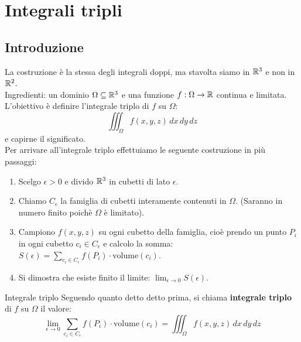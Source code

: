 \chapter{Integrali tripli}

\section{Introduzione}
La costruzione è la stessa degli integrali doppi, ma stavolta siamo in $\mathbb{R}^3$ e non in $\mathbb{R}^2$.\\
Ingredienti: un dominio $\Omega \subseteq \mathbb{R}^3$ e una funzione $f:\Omega \rightarrow \mathbb{R}$ continua e limitata.\\
L'obiettivo è definire l'integrale triplo di $f$ su $\Omega$:
\[
\iiint_{\Omega} f(x,y,z) \, dx \, dy \, dz
\]
e capirne il significato.\\
Per arrivare all'integrale triplo effettuiamo le seguente costruzione in più passaggi:
\begin{enumerate}
  \item Scelgo $\epsilon>0$ e divido $\mathbb{R}^3$ in cubetti di lato $\epsilon$.
  \item Chiamo $C_{\epsilon}$ la famiglia di cubetti interamente contenuti in $\Omega$. (Saranno in numero finito poichè $\Omega$ è limitato).
  \item Campiono $f(x,y,z)$ su ogni cubetto della famiglia, cioè prendo un punto $P_i$ in ogni cubetto $c_i\in C_{\epsilon}$ e calcolo la somma: $S(\epsilon)= \sum_{c_i \in C_{\epsilon}} f(P_i) \cdot \text{volume}(c_i)$.
  \item Si dimostra che esiste finito il limite: $\lim_{\epsilon \to 0} S(\epsilon)$.
\end{enumerate}

\begin{definizione}{Integrale triplo}
  Seguendo quanto detto detto prima, si chiama \textbf{integrale triplo} di $f$ su $\Omega$ il valore:
  \[
  \lim_{\epsilon \to 0} \sum_{c_i \in C_{\epsilon}} f(P_i) \cdot \text{volume}(c_i) = \iiint_{\Omega} f(x,y,z) \, dx \, dy \, dz
  \]
\end{definizione}


